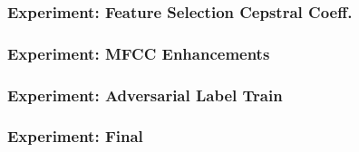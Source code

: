 \begin{frame}
  \frametitle{Experiment: Feature Selection Cepstral Coeff.}
  
\end{frame}

\begin{frame}
  \frametitle{Experiment: MFCC Enhancements}
  
\end{frame}

\begin{frame}
  \frametitle{Experiment: Adversarial Label Train}
  
\end{frame}

\begin{frame}
  \frametitle{Experiment: Final}
  
\end{frame}